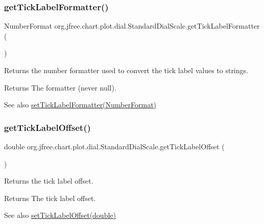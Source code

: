\subsubsection{\texorpdfstring{get\+Tick\+Label\+Formatter()}{getTickLabelFormatter()}}
{\footnotesize\ttfamily Number\+Format org.\+jfree.\+chart.\+plot.\+dial.\+Standard\+Dial\+Scale.\+get\+Tick\+Label\+Formatter (\begin{DoxyParamCaption}{ }\end{DoxyParamCaption})}

Returns the number formatter used to convert the tick label values to strings.

\begin{DoxyReturn}{Returns}
The formatter (never {\ttfamily null}).
\end{DoxyReturn}
\begin{DoxySeeAlso}{See also}
\mbox{\hyperlink{classorg_1_1jfree_1_1chart_1_1plot_1_1dial_1_1_standard_dial_scale_a0f777cb872c72e09fd3d769434c5dafc}{set\+Tick\+Label\+Formatter(\+Number\+Format)}} 
\end{DoxySeeAlso}
\mbox{\label{classorg_1_1jfree_1_1chart_1_1plot_1_1dial_1_1_standard_dial_scale_aec3bd74b6d8c18c65ebcaa9599781091}} 
\subsubsection{\texorpdfstring{get\+Tick\+Label\+Offset()}{getTickLabelOffset()}}
{\footnotesize\ttfamily double org.\+jfree.\+chart.\+plot.\+dial.\+Standard\+Dial\+Scale.\+get\+Tick\+Label\+Offset (\begin{DoxyParamCaption}{ }\end{DoxyParamCaption})}

Returns the tick label offset.

\begin{DoxyReturn}{Returns}
The tick label offset.
\end{DoxyReturn}
\begin{DoxySeeAlso}{See also}
\mbox{\hyperlink{classorg_1_1jfree_1_1chart_1_1plot_1_1dial_1_1_standard_dial_scale_a66505d5c5edc03ab1c77086635fff6c7}{set\+Tick\+Label\+Offset(double)}} 
\end{DoxySeeAlso}
\mbox{\label{classorg_1_1jfree_1_1chart_1_1plot_1_1dial_1_1_standard_dial_scale_a002b4a74a779d669ef689dd9531377f7}} 
